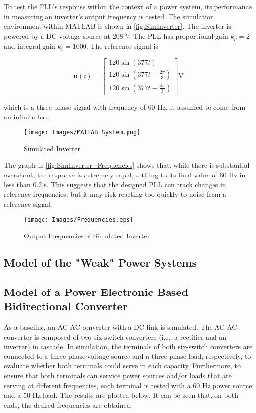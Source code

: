To test the PLL's response within the context of a power system, its performance in measuring an inverter's output frequency is tested. The simulation environment within MATLAB is shown in \autoref{fig:SimInverter}. The inverter is powered by a DC voltage source at 208 $V$. The PLL has proportional gain $k_p = 2$ and integral gain $k_i = 1000$. The reference signal is

\begin{equation*}
    \textbf{u}(t) = 
        \begin{bmatrix}
            120\sin(377t) \\
            120\sin(377t - \frac{2\pi}{3}) \\
            120\sin(377t - \frac{4\pi}{3})
        \end{bmatrix} \mathrm{V}
\end{equation*}

which is a three-phase signal with frequency of 60 Hz. It assumed to come from an infinite bus. 

\begin{figure}
    \centering
    \texttt{[image: Images/MATLAB System.png]}
    \caption{Simulated Inverter}
    \label{fig:SimInverter}
\end{figure}

The graph in \autoref{fig:SimInverter_Frequencies} shows that, while there is substantial overshoot, the response is extremely rapid, settling to its final value of 60 Hz in less than 0.2 s. This suggests that the designed PLL can track changes in reference frequencies, but it may risk reacting too quickly to noise from a reference signal.

\begin{figure}
    \centering
    \texttt{[image: Images/Frequencies.eps]}
    \caption{Output Frequencies of Simulated Inverter}
    \label{fig:SimInverter_Frequencies}
\end{figure}

\subsection{Model of the "Weak" Power Systems}

\subsection{Model of a Power Electronic Based Bidirectional Converter}

As a baseline, an AC-AC converter with a DC link is simulated. The AC-AC converter is composed of two six-switch converters (i.e., a rectifier and an inverter) in cascade. In simulation, the terminals of both six-switch converters are connected to a three-phase voltage source and a three-phase load, respectively, to evaluate whether both terminals could serve in each capacity. Furthermore, to ensure that both terminals can service power sources and/or loads that are serving at different frequencies, each terminal is tested with a 60 Hz power source and a 50 Hz load. The results are plotted below. It can be seen that, on both ends, the desired frequencies are obtained.

